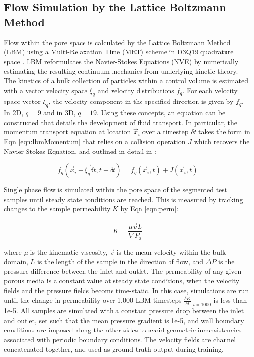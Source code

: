 \documentclass{article}
\begin{document}
\subsection{Flow Simulation by the Lattice Boltzmann Method}
\label{sec:lbm}

Flow within the pore space is calculated by the Lattice Boltzmann Method (LBM) using a Multi-Relaxation Time (MRT) scheme in D3Q19 quadrature space \cite{wang2019multi}. LBM reformulates the Navier-Stokes Equations (NVE) by numerically estimating the resulting continuum mechanics from underlying kinetic theory. The kinetics of a bulk collection of particles within a control volume is estimated with a vector velocity space $\xi_{q}$ and velocity distributions $f_{q}$. For each velocity space vector $\xi_{q}$, the velocity component in the specified direction is given by $f_{q}$. In 2D, $q=9$ and in 3D, $q=19$. Using these concepts, an equation can be constructed that details the development of fluid transport. In particular, the momentum transport equation at location $\vec{x}_{i}$ over a timestep $\delta t$ takes the form in Eqn \ref{eqn:lbmMomentum} that relies on a collision operation $J$ which recovers the Navier Stokes Equation, and outlined in detail in \cite{MCCLURE20141865}:

\begin{equation}
\label{eqn:lbmMomentum}
f_{q}(\vec{x}_{i}+\vec{\xi_{q}}\delta t, t+\delta t) = f_{q}(\vec{x}_{i}, t) + J(\vec{x}_{i}, t)
\end{equation}

Single phase flow is simulated within the pore space of the segmented test samples until steady state conditions are reached. This is measured by tracking changes to the sample permeability $K$ by Eqn \ref{eqn:perm}:

\begin{equation}
\label{eqn:perm}
K=\frac{\mu \bar{\vec{v}}L}{\nabla P_{x}}
\end{equation}

where $\mu$ is the kinematic viscosity, $\bar{\vec{v}}$ is the mean velocity within the bulk domain, $L$ is the length of the sample in the direction of flow, and $\Delta P$ is the pressure difference between the inlet and outlet. The permeability of any given porous media is a constant value at steady state conditions, when the velocity fields and the pressure fields become time-static. In this case, simulations are run until the change in permeability over 1,000 LBM timesteps $\frac{\delta K}{\delta t}|_{t=1000}$ is less than 1e-5. All samples are simulated with a constant pressure drop between the inlet and outlet, set such that the mean pressure gradient is 1e-5, and wall boundary conditions are imposed along the other sides to avoid geometric inconsistencies associated with periodic boundary conditions. The velocity fields are channel concatenated together, and used as ground truth output during training.
\end{document}
